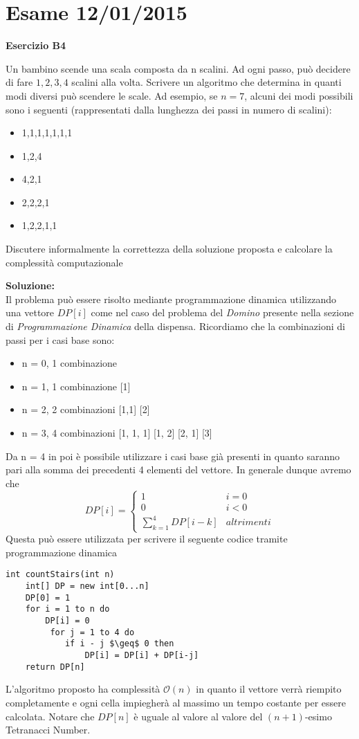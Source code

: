 \documentclass[../cheatSheetAlgoritmi.tex]{subfiles}
\begin{document}
\section{Esame 12/01/2015}
\textbf{Esercizio B4}

Un bambino scende una scala composta da n scalini. Ad ogni passo, può decidere di fare $1,2,3,4$ scalini alla volta. Scrivere un algoritmo che determina in quanti modi diversi può scendere le scale. Ad esempio, se $n= 7$, alcuni dei modi possibili sono i seguenti (rappresentati dalla lunghezza dei passi in numero di scalini):
\begin{itemize}
	\item 1,1,1,1,1,1,1
	\item 1,2,4
	\item 4,2,1
	\item 2,2,2,1
	\item 1,2,2,1,1
\end{itemize}
Discutere informalmente la correttezza della soluzione proposta e calcolare la complessità computazionale

\textbf{Soluzione:}\\
Il problema può essere risolto mediante programmazione dinamica utilizzando una vettore $DP[i]$ come nel caso del problema del \emph{Domino} presente nella sezione di \emph{Programmazione Dinamica} della dispensa. Ricordiamo che la combinazioni di passi per i casi base sono:
\begin{itemize}
	\item n = 0, 1 combinazione
	\item n = 1, 1 combinazione 	[1]
	\item n = 2, 2 combinazioni	[1,1] [2]
	\item n = 3, 4 combinazioni	[1, 1, 1] [1, 2] [2, 1] [3]
\end{itemize}
Da n = 4 in poi è possibile utilizzare i casi base già presenti in quanto saranno pari alla somma dei precedenti 4 elementi del vettore. In generale dunque avremo che 
\begin{equation*}
  	DP[i]=\begin{cases}
  		1 & \text{$i = 0$}\\
  		0 & \text{$i < 0$}\\
  		\sum_{k = 1}^{4}{DP[i-k]} & \text{$altrimenti$}
  	\end{cases}
\end{equation*}
Questa può essere utilizzata per scrivere il seguente codice tramite programmazione dinamica
\begin{lstlisting}[caption=modi per scendere le scale]
int countStairs(int n)
	int[] DP = new int[0...n]
	DP[0] = 1
	for i = 1 to n do
		DP[i] = 0
		 for j = 1 to 4 do
		 	if i - j $\geq$ 0 then
		 		DP[i] = DP[i] + DP[i-j]
	return DP[n]
\end{lstlisting}
L'algoritmo proposto ha complessità $\mathcal{O}(n)$ in quanto il vettore verrà riempito completamente e ogni cella impiegherà al massimo un tempo costante per essere calcolata. Notare che $DP[n]$ è uguale al valore al valore del $(n+1)$-esimo Tetranacci Number.
 
\end{document}
